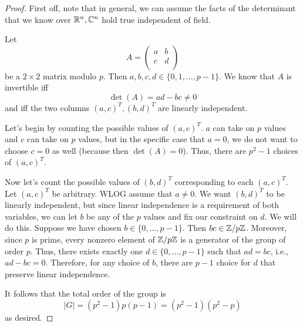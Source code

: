 \documentclass[../psets.tex]{subfiles}
\begin{document}
\begin{enumerate}
\begin{proof}
        
        First off, note that in general, we can assume the facts of the determinant that we know over $\mathbb{R}^n,\mathbb{C}^n$ hold true independent of field.\par
        Let
        \begin{equation*}
            A =
            \begin{pmatrix}
                a & b\\
                c & d\\
            \end{pmatrix}
        \end{equation*}
        be a $2\times 2$ matrix modulo $p$. Then $a,b,c,d\in\{0,1,\dots,p-1\}$. We know that $A$ is invertible iff
        \begin{equation*}
            \det(A) = ad-bc \neq 0
        \end{equation*}
        and iff the two columns $(a,c)^T,(b,d)^T$ are linearly independent.\par
        Let's begin by counting the possible values of $(a,c)^T$. $a$ can take on $p$ values and $c$ can take on $p$ values, but in the specific case that $a=0$, we do not want to choose $c=0$ as well (because then $\det(A)=0$). Thus, there are $p^2-1$ choices of $(a,c)^T$.\par
        Now let's count the possible values of $(b,d)^T$ corresponding to each $(a,c)^T$. Let $(a,c)^T$ be arbitrary. WLOG assume that $a\neq 0$. We want $(b,d)^T$ to be linearly independent, but since linear independence is a requirement of both variables, we can let $b$ be any of the $p$ values and fix our constraint on $d$. We will do this. Suppose we have chosen $b\in\{0,\dots,p-1\}$. Then $bc\in\mathbb{Z}/p\mathbb{Z}$. Moreover, since $p$ is prime, every nonzero element of $\mathbb{Z}/p\mathbb{Z}$ is a generator of the group of order $p$. Thus, there exists exactly one $d\in\{0,\dots,p-1\}$ such that $ad=bc$, i.e., $ad-bc=0$. Therefore, for any choice of $b$, there are $p-1$ choice for $d$ that preserve linear independence.\par
        It follows that the total order of the group is
        \begin{equation*}
            |G| = (p^2-1)p(p-1)
            = (p^2-1)(p^2-p)
        \end{equation*}
        as desired.
    \end{proof}
\end{enumerate}
\end{document}

